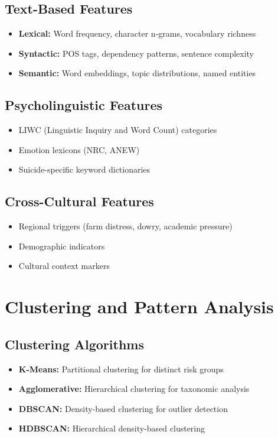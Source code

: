 \documentclass[12pt,a4paper]{article}
\begin{document}
\subsection{Text-Based Features}
\begin{itemize}
    \item \textbf{Lexical:} Word frequency, character n-grams, vocabulary richness
    \item \textbf{Syntactic:} POS tags, dependency patterns, sentence complexity
    \item \textbf{Semantic:} Word embeddings, topic distributions, named entities
\end{itemize}

\subsection{Psycholinguistic Features}
\begin{itemize}
    \item LIWC (Linguistic Inquiry and Word Count) categories
    \item Emotion lexicons (NRC, ANEW)
    \item Suicide-specific keyword dictionaries
\end{itemize}

\subsection{Cross-Cultural Features}
\begin{itemize}
    \item Regional triggers (farm distress, dowry, academic pressure)
    \item Demographic indicators
    \item Cultural context markers
\end{itemize}

\section{Clustering and Pattern Analysis}

\subsection{Clustering Algorithms}
\begin{itemize}
    \item \textbf{K-Means:} Partitional clustering for distinct risk groups
    \item \textbf{Agglomerative:} Hierarchical clustering for taxonomic analysis
    \item \textbf{DBSCAN:} Density-based clustering for outlier detection
    \item \textbf{HDBSCAN:} Hierarchical density-based clustering
\end{itemize}
\end{document}
